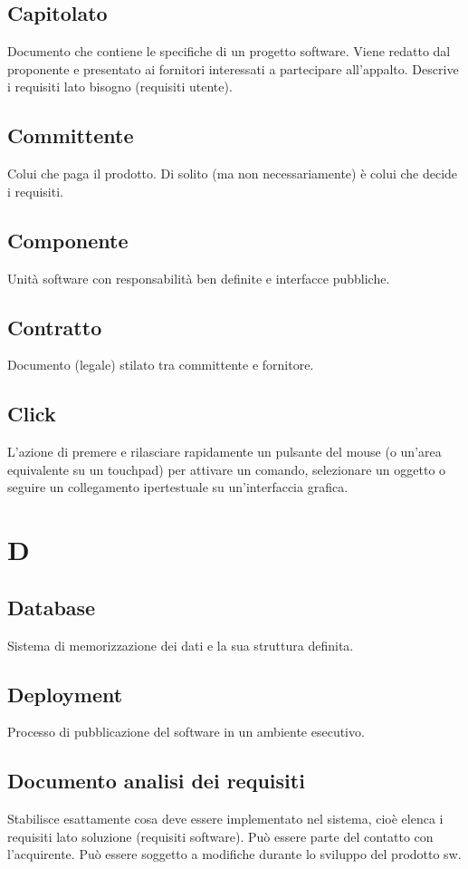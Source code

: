\documentclass[a4paper,12pt]{article}
\begin{document}
\subsection{Capitolato}
Documento che contiene le specifiche di un progetto software. Viene redatto dal proponente e presentato ai fornitori interessati a partecipare all'appalto.  
Descrive i requisiti lato bisogno (requisiti utente).

\subsection{Committente}
Colui che paga il prodotto. Di solito (ma non necessariamente) è colui che decide i requisiti.

\subsection{Componente}
Unità software con responsabilità ben definite e interfacce pubbliche.

\subsection{Contratto}
Documento (legale) stilato tra committente e fornitore.

\subsection{Click}
L'azione di premere e rilasciare rapidamente un pulsante del mouse (o un'area equivalente su un touchpad) per attivare un comando, selezionare un oggetto o seguire un collegamento ipertestuale su un'interfaccia grafica.

\section{D}

\subsection{Database}
Sistema di memorizzazione dei dati e la sua struttura definita.

\subsection{Deployment}
Processo di pubblicazione del software in un ambiente esecutivo.

\subsection{Documento analisi dei requisiti}
Stabilisce esattamente cosa deve essere implementato nel sistema, cioè elenca i requisiti lato soluzione (requisiti software).  
Può essere parte del contatto con l’acquirente.  
Può essere soggetto a modifiche durante lo sviluppo del prodotto sw.
\end{document}
